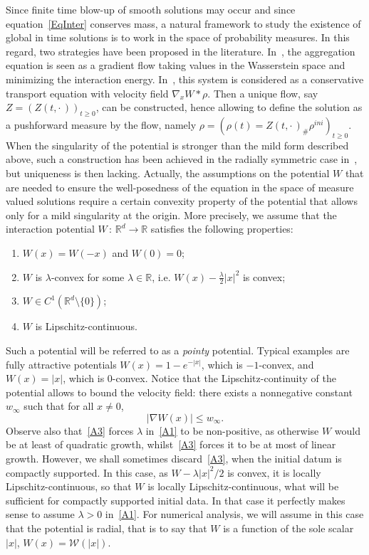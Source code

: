 \documentclass[11pt]{article}
\theoremstyle{definition}
\numberwithin{equation}{section}
\newcommand*\RR{\mathbb{R}}
\begin{document}
Since finite time blow-up of smooth solutions may occur and since equation~\eqref{EqInter} conserves mass, a natural framework to study the existence of global in time solutions is to work in the space of probability measures. In this regard, two strategies have been proposed in the literature. In~\cite{Carrillo}, the aggregation equation is seen as a gradient flow taking values in the Wasserstein space and minimizing the interaction energy. In~\cite{CJLV,NoDEA,GF_dual,lava}, this system is considered as a conservative transport equation with velocity field $\nabla_x W*\rho$. Then a unique flow, say $Z=(Z(t,{\cdot\,}))_{t \geq 0}$, can be constructed, hence allowing to define the solution as a pushforward measure by the flow, namely $\rho=(\rho(t)=Z(t,{\cdot\,})_\# \rho^{ini})_{t \ge 0}$. When the singularity of the potential is stronger than the mild form described above, such a construction has been achieved in the radially symmetric case in~\cite{Andrea_c_toaa}, but uniqueness is then lacking. Actually, the assumptions on the potential $W$ that are needed to ensure the well-posedness of the equation in the space of measure valued solutions require a certain convexity property of the potential that allows only for a mild singularity at the origin. More precisely, we assume that the interaction potential $W\,:\,\RR^d\to\RR$ satisfies the following properties:
\begin{enumerate}\renewcommand*{\theenumi}{A\arabic{enumi}}
\item \label{A0} $W(x)=W(-x)$ and $W(0)=0$;
\item \label{A1} $W$ is $\lambda$-convex for some {$\lambda \in \RR$}, i.e. $W(x)-\frac{\lambda}{2}|x|^2$ is convex;
\item \label{A2} $W\in C^1(\RR^d\setminus\{0\})$;
\item \label{A3} $W$ is Lipschitz-continuous.
\end{enumerate}
Such a potential will be referred to as a \emph{pointy} potential. Typical examples are fully attractive potentials $W(x)=1-e^{-|x|}$, which is $-1$-convex, and $W(x) = |x|$, which is $0$-convex. Notice that the Lipschitz-continuity of the potential allows to bound the velocity field: there exists a nonnegative constant $w_\infty$ such that for all $x\neq 0$,
\begin{equation}\label{borngradW}
|\nabla W(x)| \leq w_\infty.
\end{equation}
Observe also that~\eqref{A3} forces $\lambda$ in~\eqref{A1} to be non-positive, as otherwise $W$ would be at least of quadratic growth, whilst~\eqref{A3} forces it to be at most of linear growth. However, we shall sometimes discard~\eqref{A3}, when the initial datum is compactly supported. In this case, as $W - \lambda |x|^2/2$ is convex, it is locally Lipschitz-continuous, so that $W$ is locally Lipschitz-continuous, what will be sufficient for compactly supported initial data. In that case it perfectly makes sense to assume $\lambda >0$ in~\eqref{A1}. For numerical analysis, we will assume in this case that the potential is radial, that is to say that $W$ is a function of the sole scalar $|x|$, $W(x) = \mathcal{W}(|x|)$.
\end{document}
